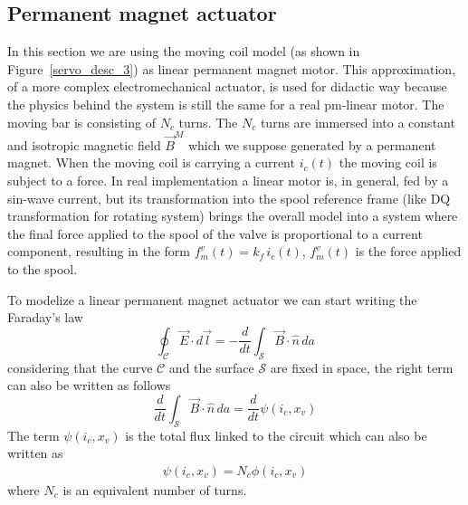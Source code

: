 \documentclass[12pt,a4paper,oneside]{book}
\begin{document}
\begin{onehalfspace}
\subsection{Permanent magnet actuator}
In this section we are using the moving coil model (as shown in Figure~\ref{servo_desc_3}) as linear permanent magnet motor. This approximation, of a more complex electromechanical actuator, is used for didactic way because the physics behind the system is still the same for a real pm-linear motor. The moving bar is consisting of $N_c$ turns. The $N_c$ turns are immersed into a constant and isotropic magnetic field $\vec{B}^M$ which we suppose generated by a permanent magnet. When the moving coil is carrying a current $i_c(t)$ the moving coil is subject to a force. In real implementation a linear motor is, in general, fed by a sin-wave current, but its transformation into the spool reference frame (like DQ transformation for rotating system) brings the overall model into a system where the final force applied to the spool of the valve is proportional to a current component, resulting in the form $f_m^v(t)=k_f\,i_c(t)$, $f_m^v(t)$ is the force applied to the spool.

To modelize a linear permanent magnet actuator we can start writing the Faraday's law 
\begin{equation}\label{feynmann_1}
	\oint_\mathcal{C}\vec{E}\cdot d\vec{l} = -\frac{d}{dt}\int_\mathcal {S}\vec{B}\cdot\hat{n}\,da
\end{equation}
considering that the curve $\mathcal{C}$ and the surface $\mathcal{S}$ are fixed in space, the right term can also be written as follows
\begin{equation}\label{feynmann_2}
	\frac{d}{dt}\int_\mathcal {S}\vec{B}\cdot\hat{n}\,da = \frac{d}{dt}\psi(i_c,x_v)
\end{equation}
The term $\psi(i_c,x_v)$ is the total flux linked to the circuit which can also be written as
\begin{equation}\label{feynmann_3}
	\begin{aligned}
		\psi(i_c,x_v) = N_c\phi(i_c,x_v)
	\end{aligned}
\end{equation}
where $N_c$ is an equivalent number of turns. 


\end{onehalfspace}
\end{document}

